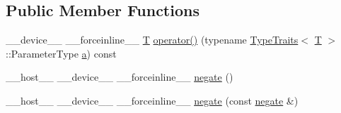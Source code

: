 \subsection*{Public Member Functions}
\begin{DoxyCompactItemize}
\item 
\-\_\-\-\_\-device\-\_\-\-\_\- \-\_\-\-\_\-forceinline\-\_\-\-\_\- \hyperlink{calib3d_8hpp_a3efb9551a871ddd0463079a808916717}{T} \hyperlink{structcv_1_1gpu_1_1device_1_1negate_a95b8db2c812deeb00d8689cbb4b35e3f}{operator()} (typename \hyperlink{structcv_1_1gpu_1_1device_1_1TypeTraits}{Type\-Traits}$<$ \hyperlink{calib3d_8hpp_a3efb9551a871ddd0463079a808916717}{T} $>$\-::Parameter\-Type \hyperlink{legacy_8hpp_a1031d0e0a97a340abfe0a6ab9e831045}{a}) const 
\item 
\-\_\-\-\_\-host\-\_\-\-\_\- \-\_\-\-\_\-device\-\_\-\-\_\- \-\_\-\-\_\-forceinline\-\_\-\-\_\- \hyperlink{structcv_1_1gpu_1_1device_1_1negate_a4bffebaa71a2580e7754969c40d33f0b}{negate} ()
\item 
\-\_\-\-\_\-host\-\_\-\-\_\- \-\_\-\-\_\-device\-\_\-\-\_\- \-\_\-\-\_\-forceinline\-\_\-\-\_\- \hyperlink{structcv_1_1gpu_1_1device_1_1negate_af46218df9211eed67c192d627f68ef04}{negate} (const \hyperlink{structcv_1_1gpu_1_1device_1_1negate}{negate} \&)
\end{DoxyCompactItemize}


